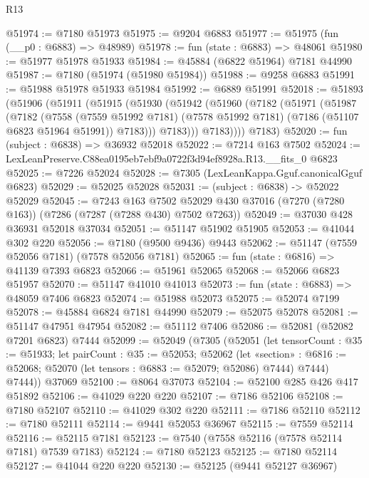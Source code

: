 \begin{lexlean}{R13}
\begin{coremodule}
@51974 := @7180 @51973
@51975 := @9204 @6883
@51977 := @51975 (fun (__p0 : @6883) => @48989)
@51978 := fun (state : @6883) => @48061
@51980 := @51977 @51978 @51933
@51984 := @45884 (@6822 @51964) @7181 @44990
@51987 := @7180 (@51974 (@51980 @51984))
@51988 := @9258 @6883
@51991 := @51988 @51978 @51933 @51984
@51992 := @6889 @51991
@52018 := @51893
    (@51906
      (@51911
        (@51915
          (@51930
            (@51942
              (@51960
                (@7182
                  (@51971
                    (@51987
                      (@7182
                        (@7558
                          (@7559 @51992 @7181)
                          (@7578 @51992 @7181)
                          (@7186 (@51107 @6823 @51964 @51991))
                          @7183)))
                    @7183)))
              @7183))))
      @7183)
@52020 := fun (subject : @6838) => @36932 @52018
@52022 := @7214 @163 @7502
@52024 := LexLeanPreserve.C88ea0195eb7ebf9a0722f3d94ef8928a.R13.__fits_0 @6823
@52025 := @7226 @52024
@52028 := @7305 (LexLeanKappa.Gguf.canonicalGguf @6823)
@52029 := @52025 @52028
@52031 := (subject : @6838) -> @52022 @52029
@52045 := @7243
    @163
    @7502
    @52029
    @430
    @37016
    (@7270 (@7280 @163))
    (@7286 (@7287 (@7288 @430) @7502 @7263))
@52049 := @37030 @428 @36931 @52018 @37034
@52051 := @51147 @51902 @51905
@52053 := @41044 @302 @220
@52056 := @7180 (@9500 @9436) @9443
@52062 := @51147 (@7559 @52056 @7181) (@7578 @52056 @7181)
@52065 := fun (state : @6816) => @41139 @7393 @6823
@52066 := @51961 @52065
@52068 := @52066 @6823 @51957
@52070 := @51147 @41010 @41013
@52073 := fun (state : @6883) => @48059 @7406 @6823
@52074 := @51988 @52073
@52075 := @52074 @7199
@52078 := @45884 @6824 @7181 @44990
@52079 := @52075 @52078
@52081 := @51147 @47951 @47954
@52082 := @51112 @7406
@52086 := @52081 (@52082 @7201 @6823) @7444
@52099 := @52049
    (@7305
      (@52051
        (let tensorCount : @35 := @51933;
        let pairCount : @35 := @52053;
        @52062
          (let «section» : @6816 := @52068; @52070 (let tensors : @6883 := @52079; @52086) @7444)
          @7444)
        @7444))
    @37069
@52100 := @8064 @37073
@52104 := @52100 @285 @426 @417 @51892
@52106 := @41029 @220 @220
@52107 := @7186 @52106
@52108 := @7180 @52107
@52110 := @41029 @302 @220
@52111 := @7186 @52110
@52112 := @7180 @52111
@52114 := @9441 @52053 @36967
@52115 := @7559 @52114
@52116 := @52115 @7181
@52123 := @7540 (@7558 @52116 (@7578 @52114 @7181) @7539 @7183)
@52124 := @7180 @52123
@52125 := @7180 @52114
@52127 := @41044 @220 @220
@52130 := @52125 (@9441 @52127 @36967)

\end{coremodule}
\end{lexlean}
